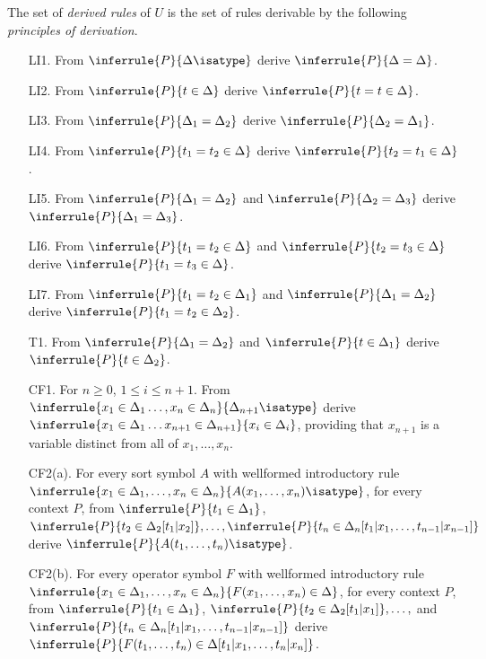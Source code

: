 \begin{definition}[2(b)]
  The set of \emph{derived rules} of $U$ is the set of rules derivable by the following \emph{principles of derivation}.
  \begin{enumerate}
    \item[LI1.] From $\inferrule{P}{\Delta\isatype}$ derive $\inferrule{P}{\Delta=\Delta}$.
    \item[LI2.] From $\inferrule{P}{t\in\Delta}$ derive $\inferrule{P}{t=t\in\Delta}$.
    \item[LI3.] From $\inferrule{P}{\Delta_1=\Delta_2}$ derive $\inferrule{P}{\Delta_2=\Delta_1}$.
    \item[LI4.] From $\inferrule{P}{t_1=t_2\in\Delta}$ derive $\inferrule{P}{t_2=t_1\in\Delta}$.
    \item[LI5.] From $\inferrule{P}{\Delta_1=\Delta_2}$ and $\inferrule{P}{\Delta_2=\Delta_3}$ derive $\inferrule{P}{\Delta_1=\Delta_3}$.
    \item[LI6.] From $\inferrule{P}{t_1=t_2\in\Delta}$ and $\inferrule{P}{t_2=t_3\in\Delta}$ derive $\inferrule{P}{t_1=t_3\in\Delta}$.
    \item[LI7.] From $\inferrule{P}{t_1=t_2\in\Delta_1}$ and $\inferrule{P}{\Delta_1=\Delta_2}$ derive $\inferrule{P}{t_1=t_2\in\Delta_2}$.
    \item[T1.] From $\inferrule{P}{\Delta_1=\Delta_2}$ and $\inferrule{P}{t\in\Delta_1}$ derive $\inferrule{P}{t\in\Delta_2}$.
    \item[CF1.] For $n\geq 0$, $1\leq i\leq n+1$.
      From $\inferrule{x_1\in\Delta_1\ldots,x_n\in\Delta_n}{\Delta_{n+1}\isatype}$ derive $\inferrule{x_1\in\Delta_1\ldots x_{n+1}\in\Delta_{n+1}}{x_i\in\Delta_i}$, providing that $x_{n+1}$ is a variable distinct from all of $x_1,\ldots,x_n$.
    \item[CF2(a).] For every sort symbol $A$ with wellformed introductory rule $\inferrule{x_1\in\Delta_1,\ldots,x_n\in\Delta_n}{A(x_1,\ldots,x_n)\isatype}$, for every context $P$, from $\inferrule{P}{t_1\in\Delta_1}$,$\inferrule{P}{t_2\in\Delta_2[t_1|x_2]},\ldots,\inferrule{P}{t_n\in\Delta_n[t_1|x_1,\ldots,t_{n-1}|x_{n-1}]}$ derive $\inferrule{P}{A(t_1,\ldots,t_n)\isatype}$.
    \item [CF2(b).] For every operator symbol $F$ with wellformed introductory rule $\inferrule{x_1\in\Delta_1,\ldots,x_n\in\Delta_n}{F(x_1,\ldots,x_n)\in\Delta}$, for every context $P$, from $\inferrule{P}{t_1\in\Delta_1}$, $\inferrule{P}{t_2\in\Delta_2[t_1|x_1]},\ldots,$ and $\inferrule{P}{t_n\in\Delta_n[t_1|x_1,\ldots,t_{n-1}|x_{n-1}]}$ derive $\inferrule{P}{F(t_1,\ldots,t_n)\in\Delta[t_1|x_1,\ldots,t_n|x_n]}$.

\end{enumerate}
\end{definition}
